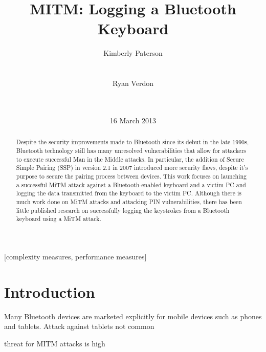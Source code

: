 \documentclass{acm_proc_article-sp}
\begin{document}
\title{MITM: Logging a Bluetooth Keyboard}

\author{
\alignauthor Kimberly Paterson\\
\\
\\
\alignauthor Ryan Verdon\\
\\
\\
}

\date{16 March 2013}
\maketitle

\begin{abstract}
Despite the security improvements made to Bluetooth since its debut in the late 1990s, Bluetooth technology still has many unresolved vulnerabilities that allow for attackers to execute successful Man in the Middle attacks. In particular, the addition of Secure Simple Pairing (SSP) in version 2.1 in 2007 introduced more security flaws, despite it's purpose to secure the pairing process between devices. This work focuses on launching a successful MiTM attack against a Bluetooth-enabled keyboard and a victim PC and logging the data transmitted from the keyboard to the victim PC. Although there is much work done on MiTM attacks and attacking PIN vulnerabilities, there has been little published research on successfully logging the keystrokes from a Bluetooth keyboard using a MiTM attack. 
\end{abstract}


[complexity measures, performance measures]


\section{Introduction}
Many Bluetooth devices are marketed explicitly for mobile devices such as phones and tablets. 
Attack against tablets not common

threat for MITM attacks is high \cite{sandhya2012analysis}
\end{document}
